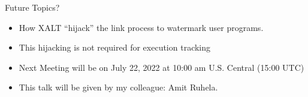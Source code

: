 \documentclass{beamer}
\begin{document}
\begin{frame}{Future Topics?}
  \begin{itemize}
    \item How XALT ``hijack'' the link process to watermark user
      programs.
    \item This hijacking is not required for execution tracking
    \item Next Meeting will be on July 22, 2022 at 10:00 am
      U.S. Central (15:00 UTC)
    \item This talk will be given by my colleague: Amit Ruhela.
  \end{itemize}
\end{frame}

%
\end{document}
